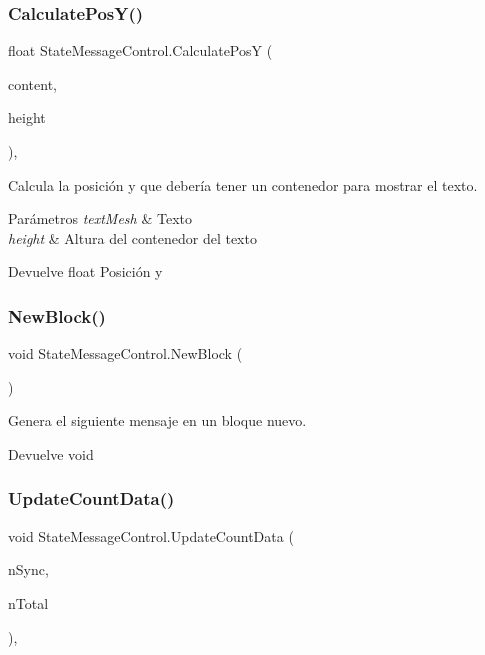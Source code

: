 \subsubsection{\texorpdfstring{CalculatePosY()}{CalculatePosY()}}
{\footnotesize\ttfamily float State\+Message\+Control.\+Calculate\+PosY (\begin{DoxyParamCaption}\item[{Game\+Object}]{content,  }\item[{float}]{height }\end{DoxyParamCaption})\hspace{0.3cm}{\ttfamily [inline]}, {\ttfamily [private]}}

Calcula la posición y que debería tener un contenedor para mostrar el texto. 
\begin{DoxyParams}{Parámetros}
{\em text\+Mesh} & Texto \\
\hline
{\em height} & Altura del contenedor del texto \\
\hline
\end{DoxyParams}
\begin{DoxyReturn}{Devuelve}
float Posición y 
\end{DoxyReturn}
\mbox{\label{class_state_message_control_a534610a9734b552696484aaeeb83c8b7}} 
\subsubsection{\texorpdfstring{NewBlock()}{NewBlock()}}
{\footnotesize\ttfamily void State\+Message\+Control.\+New\+Block (\begin{DoxyParamCaption}{ }\end{DoxyParamCaption})\hspace{0.3cm}{\ttfamily [inline]}}

Genera el siguiente mensaje en un bloque nuevo. \begin{DoxyReturn}{Devuelve}
void 
\end{DoxyReturn}
\mbox{\label{class_state_message_control_a09f2f0b683668a6b87f01078626c1ee0}} 
\subsubsection{\texorpdfstring{UpdateCountData()}{UpdateCountData()}}
{\footnotesize\ttfamily void State\+Message\+Control.\+Update\+Count\+Data (\begin{DoxyParamCaption}\item[{int}]{n\+Sync,  }\item[{int}]{n\+Total }\end{DoxyParamCaption})\hspace{0.3cm}{\ttfamily [inline]}, {\ttfamily [private]}}


